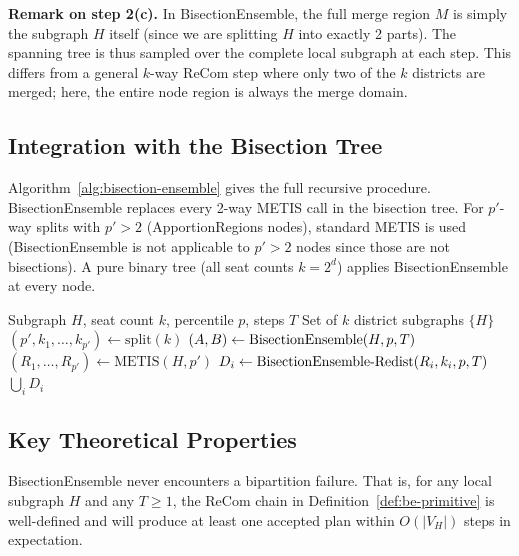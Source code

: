 \noindent\textbf{Remark on step 2(c).} In BisectionEnsemble, the full merge
region $M$ is simply the subgraph $H$ itself (since we are splitting $H$ into
exactly 2 parts). The spanning tree is thus sampled over the complete local
subgraph at each step. This differs from a general $k$-way ReCom step where
only two of the $k$ districts are merged; here, the entire node region is
always the merge domain.

\subsection{Integration with the Bisection Tree}
\label{sec:alg:tree}

Algorithm~\ref{alg:bisection-ensemble} gives the full recursive procedure.
BisectionEnsemble replaces every 2-way METIS call in the bisection tree.
For $p'$-way splits with $p' > 2$ (ApportionRegions nodes), standard METIS
is used (BisectionEnsemble is not applicable to $p' > 2$ nodes since those
are not bisections). A pure binary tree (all seat counts $k = 2^d$) applies
BisectionEnsemble at every node.

\begin{algorithm}[h]
\caption{BisectionEnsemble redistricting}
\label{alg:bisection-ensemble}
\begin{algorithmic}[1]
\Require Subgraph $H$, seat count $k$, percentile $p$, steps $T$
\Ensure Set of $k$ district subgraphs
  \Return $\{H\}$
\EndIf
\State $(p', k_1, \ldots, k_{p'}) \leftarrow \text{split}(k)$ 
 
  \State $(A, B) \leftarrow \textup{BisectionEnsemble}(H, p, T)$
\Else {}
  \State $(R_1, \ldots, R_{p'}) \leftarrow \text{METIS}(H, p')$
\EndIf
{}
  \State $D_i \leftarrow \textup{BisectionEnsemble-Redist}(R_i, k_i, p, T)$
\EndFor
\Return $\bigcup_i D_i$
\end{algorithmic}
\end{algorithm}

\subsection{Key Theoretical Properties}
\label{sec:alg:theory}

\begin{theorem}[Tractability]
  \label{thm:tractable}
  BisectionEnsemble never encounters a bipartition failure. That is, for any
  local subgraph $H$ and any $T \geq 1$, the ReCom chain in Definition~\ref{def:be-primitive}
  is well-defined and will produce at least one accepted plan within
  $O(|V_H|)$ steps in expectation.
\end{theorem}

